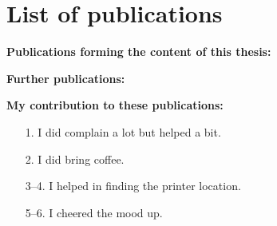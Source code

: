\chapter*{List of publications}

\noindent
\textbf{Publications forming the content of this thesis:}
\begin{refsection}[ownpubs]
  \small%
  \nocite{*}
  \printbibliography[heading=none,type=article]
\end{refsection}

\textbf{Further publications:}
\begin{refsection}[otherownpubs]
	\nocite{*}
	\printbibliography[heading=none,type=article, resetnumbers=false]
\end{refsection}

\textbf{My contribution to these publications:}
\begin{enumerate}
	\item[1.] I did complain a lot but helped a bit.
	\item[2.] I did bring coffee.
	\item[3--4.] I helped in finding the printer location.
	\item[5--6.] I cheered the mood up.
\end{enumerate}
